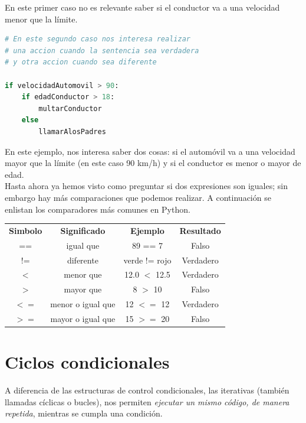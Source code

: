 \documentclass[a4paper, openright, 12pt]{article}
\begin{document}
    En este primer caso no es relevante saber si el conductor va a una velocidad menor que la límite.\\

\begin{lstlisting}[language=Python]
# En este segundo caso nos interesa realizar
# una accion cuando la sentencia sea verdadera
# y otra accion cuando sea diferente

if velocidadAutomovil > 90:
    if edadConductor > 18:
        multarConductor
    else
        llamarAlosPadres          
\end{lstlisting}

  En este ejemplo, nos interesa saber dos cosas: si el automóvil va a una velocidad mayor que la límite (en este caso 90 km/h) y si el conductor es menor o mayor de edad.\\

  Hasta ahora ya hemos visto como preguntar si dos expresiones son iguales; sin embargo hay más comparaciones que podemos realizar. A continuación se enlistan los comparadores más comunes en Python.\\



\begin{center}
  \begin{tabular}{ |c|c|c|c| } 
    \hline
      \textbf{Simbolo}&\textbf{Significado} & \textbf{Ejemplo} & \textbf{Resultado} \\ 
      ==    & igual que      &    89 == 7       & Falso\\ 
      !=    & diferente      &    verde != rojo & Verdadero\\
      $<$   & menor que      &    12.0 $<$ 12.5   & Verdadero\\
      $>$   & mayor que      &    8 $>$ 10        & Falso\\
      $<=$  & menor o igual que & 12 $<=$ 12      & Verdadero\\
      $>=$  & mayor o igual que & 15 $>=$ 20      & Falso\\ 
    \hline
  \end{tabular}
\end{center}

    \newpage{}


  \section{Ciclos condicionales}
    A diferencia de las estructuras de control condicionales, las iterativas (también llamadas cíclicas o bucles), nos permiten \textit{ejecutar un mismo código, de manera repetida}, mientras se cumpla una condición.\\
\end{document}
